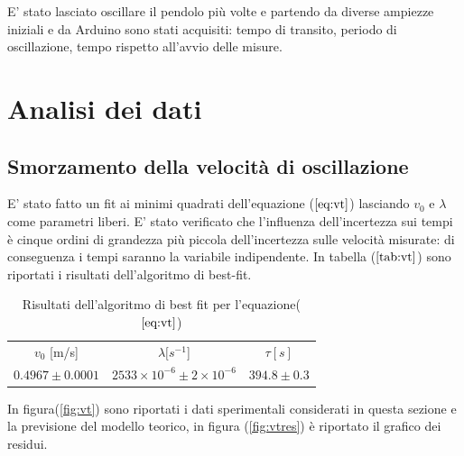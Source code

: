 \documentclass{article}
\begin{document}
E' stato lasciato oscillare il pendolo più volte e partendo da diverse ampiezze iniziali e da Arduino sono stati acquisiti: tempo di transito, periodo di oscillazione, tempo rispetto all'avvio delle misure.





\section{Analisi dei dati}

\subsection{Smorzamento della velocità di oscillazione}
\label{sez:vt}

E' stato fatto un fit ai minimi quadrati dell'equazione ($\ref{eq:vt}$) lasciando $v_0$ e $\lambda$ come parametri liberi.
E' stato verificato che l'influenza dell'incertezza sui tempi è cinque ordini di grandezza più piccola dell'incertezza sulle velocità misurate: di conseguenza i tempi saranno la variabile indipendente.
In tabella ($\ref{tab:vt}$) sono riportati i risultati dell'algoritmo di best-fit.

\begin{table}[h!]
		\centering
		\begin{tabular}{|ccc|}
			\hline

			$v_0$ [m/s] &  $\lambda [s^{-1}$] & $\tau[s]$ 	\\
			$0.4967 \pm 0.0001$	 & 	$2533 \times 10^{-6} \pm 2 \times 10^{-6}$ 	& $394.8\pm0.3$\\
			\hline
			
		\end{tabular}
		\caption{Risultati dell'algoritmo di best fit per l'equazione($\ref{eq:vt}$)} 
            \label{tab:vt}	
\end{table}

In figura(\ref{fig:vt}) sono riportati i dati sperimentali considerati in questa sezione e la previsione del modello teorico, in figura (\ref{fig:vtres}) è riportato il grafico dei residui.
\end{document}
